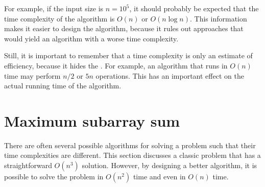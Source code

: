 For example, if the input size is $n=10^5$,
it should probably be expected that the time
complexity of the algorithm is $O(n)$ or $O(n \log n)$.
This information makes it easier to design the algorithm,
because it rules out approaches that would yield
an algorithm with a worse time complexity.


Still, it is important to remember that a
time complexity is only an estimate of efficiency,
because it hides the .
For example, an algorithm that runs in $O(n)$ time
may perform $n/2$ or $5n$ operations.
This has an important effect on the actual
running time of the algorithm.

\section{Maximum subarray sum}


There are often several possible algorithms
for solving a problem such that their
time complexities are different.
This section discusses a classic problem that
has a straightforward $O(n^3)$ solution.
However, by designing a better algorithm, it
is possible to solve the problem in $O(n^2)$
time and even in $O(n)$ time.


